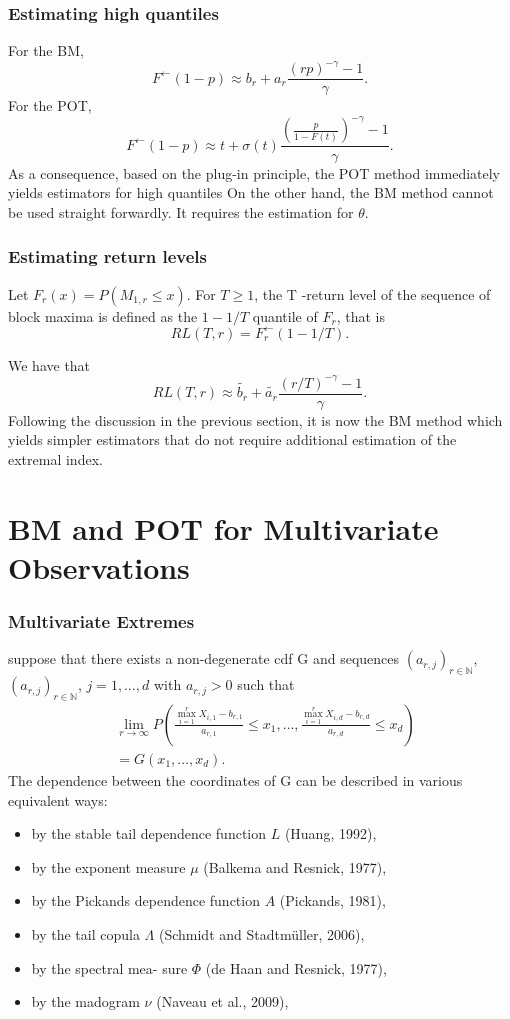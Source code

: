 \documentclass{beamer}
\newcommand{\suit}[1]{\left(#1\right)}
\begin{document}
\begin{frame}
    \frametitle{Estimating high quantiles}
For the BM,
$$
F^{\leftarrow}(1-p)\approx b_r+a_r\frac{(rp)^{-\gamma}-1}{\gamma}.
$$
For the POT,
$$
F^{\leftarrow}(1-p)\approx t+\sigma(t)\frac{(\frac{p}{1-F(t)})^{-\gamma}-1}{\gamma}.
$$
As a consequence, based on the plug-in principle, the POT method immediately
yields estimators for high quantiles On the other hand, the BM method cannot be used straight forwardly. It requires the estimation for $\theta$.
\end{frame}

\begin{frame}
    \frametitle{Estimating return levels}
Let $F_r(x)=P(M_{1,r}\le x)$. For $T\ge 1$, the T -return level of the sequence of block maxima is defined as the $1-1/T$ quantile of $F_r$, that is
$$
RL(T,r)=F_r^{\leftarrow}(1-1/T).
$$
    
We have that 
$$
RL(T,r) \approx \tilde{b_r}+\tilde{a_r}\frac{(r/T)^{-\gamma}-1}{\gamma}.
$$
Following the
discussion in the previous section, it is now the BM method which yields simpler estimators that
do not require additional estimation of the extremal index.
\end{frame}

\section{BM and POT for Multivariate Observations}

\begin{frame}
    \frametitle{Multivariate Extremes}
    suppose that there exists a non-degenerate cdf G and sequences $(a_{r,j})_{r\in \mathbb{N}}$, $(a_{r,j})_{r\in \mathbb{N}}$, $j=1,\dots,d$ with $a_{r,j}>0$ such that
    $$
    \begin{aligned}
&\lim_{r\to \infty}P\suit{\frac{\max_{i=1}^r X_{i,1}-b_{r,1}}{a_{r,1}}\le x_1,\dots,\frac{\max_{i=1}^r X_{i,d}-b_{r,d}}{a_{r,d}}\le x_d}\\
&=G(x_1,\dots,x_d).
    \end{aligned}
    $$
    The dependence between the coordinates of G can be described in various equivalent ways:
\begin{itemize}
    \item by the stable tail dependence function $L$ (Huang, 1992), 
    \item by
    the exponent measure $\mu$ (Balkema and Resnick, 1977), 
    \item by the Pickands dependence function $A$
    (Pickands, 1981), 
    \item by the tail copula $\Lambda$ (Schmidt and Stadtmüller, 2006),
    \item  by the spectral mea-
    sure $\Phi$ (de Haan and Resnick, 1977),
    \item by the madogram $\nu$ (Naveau et al., 2009),
\end{itemize}
    

\end{frame}
\end{document}
